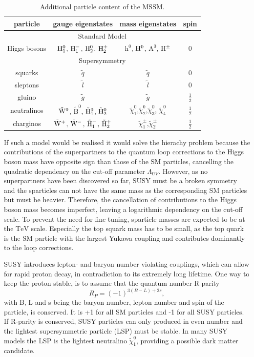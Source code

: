 \begin{table}
\centering
 \renewcommand{\arraystretch}{1.3}
\caption{Additional particle content of the MSSM.}
\label{tab:MSSM}
\begin{tabular}{c|c|c|c}
particle & gauge eigenstates  & mass eigenstates & spin   \\
\hline
\multicolumn{4}{c}{Standard Model} \\
\hline
Higgs bosons & $\mathrm{H}_1^0$, $\mathrm{H}_1^{-}$, $\mathrm{H}_2^0$, $\mathrm{H}_2^+$ & $\mathrm{h}^0$, $\mathrm{H}^0$, $\mathrm{A}^0$, $\mathrm{H}^{\pm}$ & 0 \\
\hline
\multicolumn{4}{c}{Supersymmetry} \\
\hline
squarks & $\tilde{q}$ & $\tilde{q}$ & 0 \\
sleptons & $\tilde{l}$ & $\tilde{l}$ & 0 \\
 gluino & $\tilde{g}$ & $\tilde{g}$ & $\frac{1}{2}$ \\
neutralinos & $\tilde{\mathrm{W}}^0$, $\tilde{\mathrm{B}}^0$, $\tilde{\mathrm{H}}_1^0$, $\tilde{\mathrm{H}}_2^0$ & $\tilde{\chi}^0_1$,$\tilde{\chi}^0_2$,$\tilde{\chi}^0_3$, $\tilde{\chi}^0_4$ & $\frac{1}{2}$\\
charginos & $\tilde{\mathrm{W}}^+$, $\tilde{\mathrm{W}}^-$, $\tilde{\mathrm{H}}_1^-$, $\tilde{\mathrm{H}}_2^+$ & $\tilde{\chi}^{\pm}_1$,$\tilde{\chi}^{\pm}_2$ & $\frac{1}{2}$ \\ 
\end{tabular}
\end{table} 

If such a model would be realised it would solve the hierachy problem because the contributions of the superpartners to the quantum loop corrections to the Higgs boson mass have opposite sign than those of the SM particles, cancelling the quadratic dependency on the cut-off parameter $\Lambda_{UV}$. However, as no superpartners have been discovered so far, SUSY must be a broken symmetry and the sparticles can not have the same mass as the corresponding SM particles but must be heavier. Therefore, the cancellation of contributions to the Higgs boson mass becomes imperfect, leaving a logarithmic dependency on the cut-off scale. To prevent the need for fine-tuning, sparticle masses are expected to be at the $\mathrm{TeV}$ scale. Especially the top squark mass has to be small, as the top quark is the SM particle with the largest Yukawa coupling and contributes dominantly to the loop corrections. 

SUSY introduces lepton- and baryon number violating couplings, which can allow for rapid proton decay, in contradiction to its extremely long lifetime. One way to keep the proton stable, is to assume that the quantum number R-parity
\begin{equation}
R_P = (-1)^{3(B-L)+2s},
\end{equation} 
with B, L and s being the baryon number, lepton number and spin of the particle, is conserved. It is +1 for all SM particles and -1 for all SUSY particles. If R-parity is conserved, SUSY particles can only produced in even number and the lightest supersymmetric particle (LSP) must be stable. In many SUSY models the LSP is the lightest neutralino $\tilde{\chi}^0_1$, providing a possible dark matter candidate. 


